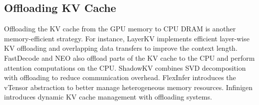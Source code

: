 \subsection{Offloading KV Cache}

Offloading the KV cache from the GPU memory to CPU DRAM is another memory-efficient strategy. For instance, LayerKV \cite{xiong2024layerkv} implements efficient layer-wise KV offloading and overlapping data transfers to improve the context length. FastDecode \cite{he2024fastdecode} and NEO \cite{jiang2024neo} also offload parts of the KV cache to the CPU and perform attention computations on the CPU. ShadowKV \cite{sun2024shadowkv} combines SVD decomposition with offloading to reduce communication overhead. FlexInfer \cite{xu2024vtensor} introduces the vTensor abstraction to better manage heterogeneous memory resources. Infinigen \cite{lee2024infinigen} introduces dynamic KV cache management with offloading systems.

